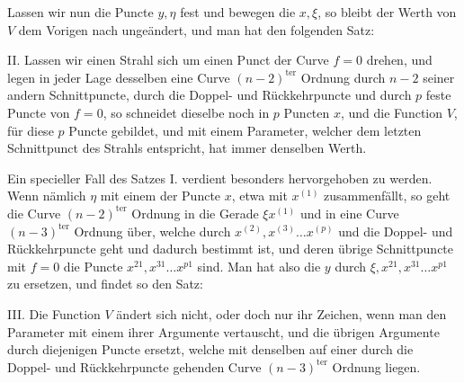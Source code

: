 \documentclass[10pt]{article}
\begin{document}
Lassen wir nun die Puncte \(y,\eta\) fest und bewegen die \(x,\xi\), so bleibt der Werth von \(V\) dem Vorigen nach ungeändert, und man hat den folgenden Satz:

II. Lassen wir einen Strahl sich um einen Punct der Curve \(f=0\) drehen, und legen in jeder Lage desselben eine Curve \((n-2)^{\mathrm{ter}}\) Ordnung durch \(n-2\) seiner andern Schnittpuncte, durch die Doppel- und Rückkehrpuncte und durch \(p\) feste Puncte von \(f=0\), so schneidet dieselbe noch in \(p\) Puncten \(x\), und die Function \(V\), für diese \(p\) Puncte gebildet, und mit einem Parameter, welcher dem letzten Schnittpunct des Strahls entspricht, hat immer denselben Werth.

Ein specieller Fall des Satzes I. verdient besonders hervorgehoben zu werden. Wenn nämlich \(\eta\) mit einem der Puncte \(x\), etwa mit \(x^{(1)}\) zusammenfällt, so geht die Curve \((n-2)^{\mathrm{ter}}\) Ordnung in die Gerade \(\xi x^{(1)}\) und in eine Curve \((n-3)^{\mathrm{ter}}\) Ordnung über, welche durch \(x^{(2)},x^{(3)}\ldots x^{(p)}\) und die Doppel- und Rückkehrpuncte geht und dadurch bestimmt ist, und deren übrige Schnittpuncte mit \(f=0\) die Puncte \(x^{21},x^{31}\ldots x^{p1}\) sind. Man hat also die \(y\) durch \(\xi,x^{21},x^{31}\ldots x^{p1}\) zu ersetzen, und findet so den Satz:

III. Die Function \(V\) ändert sich nicht, oder doch nur ihr Zeichen, wenn man den Parameter mit einem ihrer Argumente vertauscht, und die übrigen Argumente durch diejenigen Puncte ersetzt, welche mit denselben auf einer durch die Doppel- und Rückkehrpuncte gehenden Curve \((n-3)^{\mathrm{ter}}\) Ordnung liegen.
\end{document}
